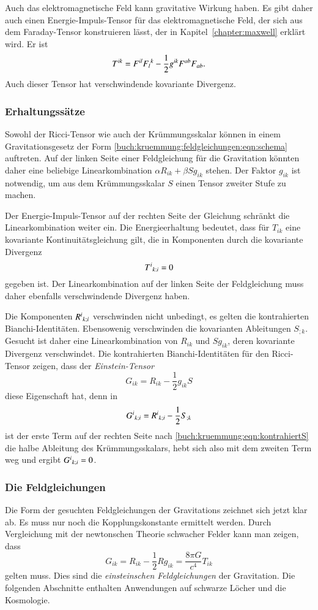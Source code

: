 Auch das elektromagnetische Feld kann gravitative Wirkung haben.
Es gibt daher auch einen Energie-Impuls-Tensor für das elektromagnetische
Feld, der sich aus dem Faraday-Tensor konstruieren lässt, der in
Kapitel~\ref{chapter:maxwell} erklärt wird.
Er ist
\[
T^{ik}
=
F^{il}F_l\mathstrut^k - \frac12 g^{ik}F^{ab}F_{ab}.
\]
Auch dieser Tensor hat verschwindende kovariante Divergenz.

%
%
\subsubsection{Erhaltungssätze}
Sowohl der Ricci-Tensor wie auch der Krümmungsskalar können in einem
Gravitationsgesetz der Form \eqref{buch:kruemmung:feldgleichungen:eqn:schema}
auftreten.
Auf der linken Seite einer Feldgleichung für die Gravitation könnten daher
eine beliebige Linearkombination $\alpha R_{ik}+\beta Sg_{ik}$ stehen.
Der Faktor $g_{ik}$ ist notwendig, um aus dem Krümmungsskalar $S$ einen
Tensor zweiter Stufe zu machen.

Der Energie-Impuls-Tensor auf der rechten Seite der Gleichung schränkt
die Linearkombination weiter ein.
Die Energieerhaltung bedeutet, dass für $T_{ik}$ eine kovariante 
Kontinuitätsgleichung gilt, die in Komponenten durch die kovariante
Divergenz
\[
T^i\mathstrut_{k;i}
=
0
\]
gegeben ist.
Der Linearkombination auf der linken Seite der Feldgleichung muss daher
ebenfalls verschwindende Divergenz haben.

Die Komponenten $R^i\mathstrut_{k;i}$ verschwinden nicht unbedingt,
es gelten die kontrahierten Bianchi-Identitäten.
Ebensowenig verschwinden die kovarianten Ableitungen $S_{;k}$.
Gesucht ist daher eine Linearkombination von $R_{ik}$ und $Sg_{ik}$,
deren kovariante Divergenz verschwindet.
Die kontrahierten Bianchi-Identitäten für den Ricci-Tensor zeigen, dass  der
\emph{Einstein-Tensor}
%
\[
G_{ik}
=
R_{ik}
-\frac12 g_{ik}S
\]
diese Eigenschaft hat, denn in
\[
G^i\mathstrut_{k;i}
=
R^i\mathstrut_{k;i}
-
\frac12 S_{;k}
\]
ist der erste Term auf der rechten Seite
nach \eqref{buch:kruemmung:eqn:kontrahiertS}
die halbe Ableitung des Krümmungsskalars, hebt sich also mit dem
zweiten Term weg und ergibt $G^i\mathstrut_{k;i}=0$.

%
%
\subsubsection{Die Feldgleichungen}
Die Form der gesuchten Feldgleichungen der Gravitations zeichnet sich
jetzt klar ab.
Es muss nur noch die Kopplungskonstante ermittelt werden.
Durch Vergleichung mit der newtonschen Theorie schwacher Felder 
kann man zeigen, dass 
\begin{equation}
G_{ik}
=
R_{ik}
-
\frac12 Rg_{ik}
=
\frac{8\pi G}{c^4}T_{ik}
\label{buch:kruemmung:feldgleichung:eqn:feldgleichung}
\end{equation}
gelten muss.
Dies sind die \emph{einsteinschen Feldgleichungen} der Gravitation.
%
%
Die folgenden Abschnitte enthalten Anwendungen auf schwarze Löcher
und die Kosmologie.

